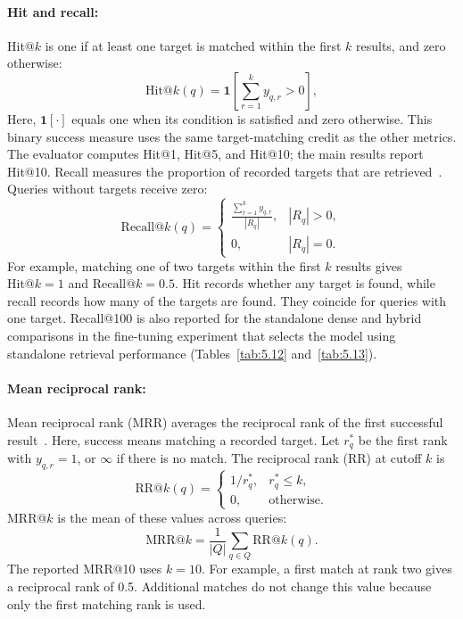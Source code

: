 \paragraph{Hit and recall:}
Hit@\(k\) is one if at least one target is matched within the first \(k\) results, and zero otherwise:
\[
\mathrm{Hit}@k(q)=\mathbf{1}\left[\sum_{r=1}^{k}y_{q,r}>0\right],
\]
Here, \(\mathbf{1}[\cdot]\) equals one when its condition is satisfied and zero otherwise. This binary success measure uses the same target-matching credit as the other metrics. The evaluator computes Hit@1, Hit@5, and Hit@10; the main results report Hit@10. Recall measures the proportion of recorded targets that are retrieved~\cite{manning2008}. Queries without targets receive zero:
\[
\mathrm{Recall}@k(q)=
\begin{cases}
\displaystyle\frac{\sum_{r=1}^{k}y_{q,r}}{|R_q|}, & |R_q|>0,\\[6pt]
0, & |R_q|=0.
\end{cases}
\]
For example, matching one of two targets within the first \(k\) results gives \(\mathrm{Hit}@k=1\) and \(\mathrm{Recall}@k=0.5\). Hit records whether any target is found, while recall records how many of the targets are found. They coincide for queries with one target. Recall@100 is also reported for the standalone dense and hybrid comparisons in the fine-tuning experiment that selects the model using standalone retrieval performance (Tables~\ref{tab:5.12} and~\ref{tab:5.13}).

\paragraph{Mean reciprocal rank:}
Mean reciprocal rank (MRR) averages the reciprocal rank of the first successful result~\cite{voorhees2000qa}. Here, success means matching a recorded target. Let \(r_q^*\) be the first rank with \(y_{q,r}=1\), or \(\infty\) if there is no match. The reciprocal rank (RR) at cutoff \(k\) is
\[
\mathrm{RR}@k(q)=
\begin{cases}
1/r_q^*, & r_q^*\leq k,\\
0, & \text{otherwise}.
\end{cases}
\]
MRR@\(k\) is the mean of these values across queries:
\[
\mathrm{MRR}@k=\frac{1}{|Q|}\sum_{q\in Q}\mathrm{RR}@k(q).
\]
The reported MRR@10 uses \(k=10\). For example, a first match at rank two gives a reciprocal rank of 0.5. Additional matches do not change this value because only the first matching rank is used.



